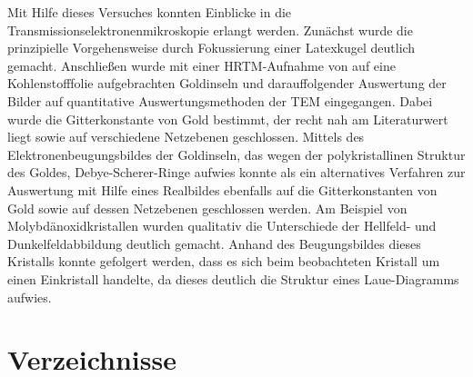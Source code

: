 \documentclass[slug=TEM, room=IFW, supervisor=?, coursedate=23.\ 01.\ 2020]{../../Lab_Report_LaTeX/lab_report}
\begin{document}
Mit Hilfe dieses Versuches konnten Einblicke in die Transmissionselektronenmikroskopie erlangt
werden. Zunächst wurde die prinzipielle Vorgehensweise durch Fokussierung einer Latexkugel
deutlich gemacht. Anschließen wurde mit einer HRTM-Aufnahme von auf eine Kohlenstofffolie
aufgebrachten Goldinseln und darauffolgender Auswertung der Bilder auf quantitative
Auswertungsmethoden der TEM eingegangen. Dabei wurde die Gitterkonstante von Gold bestimmt, der
recht nah am Literaturwert liegt sowie auf verschiedene Netzebenen geschlossen. Mittels des
Elektronenbeugungsbildes der Goldinseln, das wegen der polykristallinen Struktur des Goldes,
Debye-Scherer-Ringe aufwies konnte als ein alternatives Verfahren zur Auswertung mit Hilfe eines
Realbildes ebenfalls auf die Gitterkonstanten von Gold sowie auf dessen Netzebenen geschlossen
werden. Am Beispiel von Molybdänoxidkristallen wurden qualitativ die Unterschiede der Hellfeld-
und Dunkelfeldabbildung deutlich gemacht. Anhand des Beugungsbildes dieses Kristalls konnte
gefolgert werden, dass es sich beim beobachteten Kristall um einen Einkristall handelte, da
dieses deutlich die Struktur eines Laue-Diagramms aufwies. 

\newpage
\section{Verzeichnisse}
\label{sec:literatur}

\listoffigures

\listoftables

\printbibliography
\end{document}
